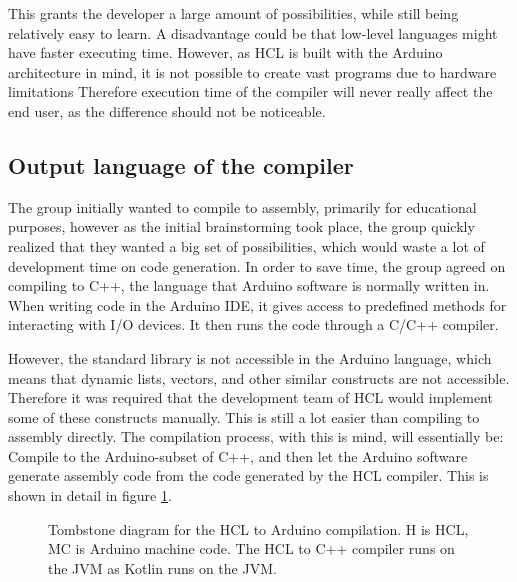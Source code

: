 This grants the developer a large amount of possibilities, while still being relatively easy to learn.
A disadvantage could be that low-level languages might have faster executing time. 
However, as HCL is built with the Arduino architecture in mind, it is not possible to create vast programs due to hardware limitations
Therefore execution time of the compiler will never really affect the end user, as the difference should not be noticeable.

\subsection{Output language of the compiler}
The group initially wanted to compile to assembly, primarily for educational purposes, however as the initial brainstorming took place, the group quickly realized that they wanted a big set of possibilities, which would waste a lot of development time on code generation. 
In order to save time, the group agreed on compiling to C++, the language that Arduino software is normally written in.
When writing code in the Arduino IDE, it gives access to predefined methods for interacting with I/O devices.
It then runs the code through a C/C++ compiler\cite{ArFAQ}.

However, the standard library is not accessible in the Arduino language, which means that dynamic lists, vectors, and other similar constructs are not accessible.
Therefore it was required that the development team of HCL would implement some of these constructs manually.
This is still a lot easier than compiling to assembly directly. 
The compilation process, with this is mind, will essentially be: Compile to the Arduino-subset of C++, and then let the Arduino software generate assembly code from the code generated by the HCL compiler.
This is shown in detail in figure \ref{fig:HCLTStone}.


\begin{figure}[H]
	\centering
	\caption{
		Tombstone diagram for the HCL to Arduino compilation.
		H is HCL, MC is Arduino machine code.
		The HCL to C++ compiler runs on the JVM as Kotlin runs on the JVM.
	}
	\label{fig:HCLTStone}
\end{figure}


